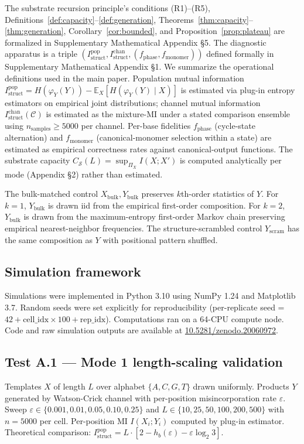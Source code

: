 \documentclass[aps,prx,reprint,amsmath,amssymb,floatfix,superscriptaddress,nofootinbib]{revtex4-2}
\newcommand{\zenodoDOI}{\href{https://doi.org/10.5281/zenodo.20060972}{10.5281/zenodo.20060972}}
\theoremstyle{plain-thm}
\theoremstyle{definition-thm}
\newcommand{\Istructpop}{I_{\mathrm{struct}}^{\mathrm{pop}}}
\newcommand{\Istructchan}{I_{\mathrm{struct}}^{\mathrm{chan}}}
\newcommand{\fphase}{f_{\mathrm{phase}}}
\newcommand{\fmonomer}{f_{\mathrm{monomer}}}
\newcommand{\Csub}{C_{\mathcal{S}}}
\newcommand{\Hbin}{h_b}
\newcommand{\descY}{\varphi_Y}
\begin{document}
The substrate recursion principle's conditions (R1)--(R5), Definitions~\ref{def:capacity}--\ref{def:generation}, Theorems~\ref{thm:capacity}--\ref{thm:generation}, Corollary~\ref{cor:bounded}, and Proposition~\ref{prop:plateau} are formalized in Supplementary Mathematical Appendix \S5. The diagnostic apparatus is a triple $(\Istructpop, \Istructchan, (\fphase, \fmonomer))$ defined formally in Supplementary Mathematical Appendix \S1. We summarize the operational definitions used in the main paper. Population mutual information $\Istructpop = H(\descY(Y)) - \mathbb{E}_X[H(\descY(Y) \mid X)]$ is estimated via plug-in entropy estimators on empirical joint distributions; channel mutual information $\Istructchan(\mathcal{C})$ is estimated as the mixture-MI under a stated comparison ensemble using $n_{\mathrm{samples}} \ge 5000$ per channel. Per-base fidelities $\fphase$ (cycle-state alternation) and $\fmonomer$ (canonical-monomer selection within a state) are estimated as empirical correctness rates against canonical-output functions. The substrate capacity $\Csub(L) = \sup_{\Pi_X} I(X; X')$ is computed analytically per mode (Appendix \S2) rather than estimated.

The bulk-matched control $X_{\mathrm{bulk}}, Y_{\mathrm{bulk}}$ preserves $k$th-order statistics of $Y$. For $k = 1$, $Y_{\mathrm{bulk}}$ is drawn iid from the empirical first-order composition. For $k = 2$, $Y_{\mathrm{bulk}}$ is drawn from the maximum-entropy first-order Markov chain preserving empirical nearest-neighbor frequencies. The structure-scrambled control $Y_{\mathrm{scram}}$ has the same composition as $Y$ with positional pattern shuffled.

\subsection{Simulation framework}

Simulations were implemented in Python 3.10 using NumPy 1.24 and Matplotlib 3.7. Random seeds were set explicitly for reproducibility (per-replicate seed = $42 + \mathrm{cell\_idx} \times 100 + \mathrm{rep\_idx}$). Computations ran on a 64-CPU compute node. Code and raw simulation outputs are available at \zenodoDOI{}.

\subsection{Test A.1 --- Mode 1 length-scaling validation}

Templates $X$ of length $L$ over alphabet $\{A, C, G, T\}$ drawn uniformly. Products $Y$ generated by Watson-Crick channel with per-position misincorporation rate $\varepsilon$. Sweep $\varepsilon \in \{0.001, 0.01, 0.05, 0.10, 0.25\}$ and $L \in \{10, 25, 50, 100, 200, 500\}$ with $n = 5000$ per cell. Per-position MI $I(X_i; Y_i)$ computed by plug-in estimator. Theoretical comparison: $\Istructpop = L \cdot \left[2 - \Hbin(\varepsilon) - \varepsilon \log_2 3\right]$.
\end{document}

